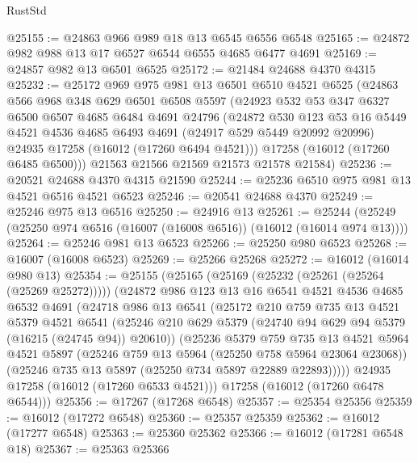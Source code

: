 \begin{lexlean}{RustStd}
\begin{coremodule}
@25155 := @24863 @966 @989 @18 @13 @6545 @6556 @6548
@25165 := @24872 @982 @988 @13 @17 @6527 @6544 @6555 @4685 @6477 @4691
@25169 := @24857 @982 @13 @6501 @6525
@25172 := @21484 @24688 @4370 @4315
@25232 := @25172
    @969
    @975
    @981
    @13
    @6501
    @6510
    @4521
    @6525
    (@24863
      @566
      @968
      @348
      @629
      @6501
      @6508
      @5597
      (@24923
        @532
        @53
        @347
        @6327
        @6500
        @6507
        @4685
        @6484
        @4691
        @24796
        (@24872
          @530
          @123
          @53
          @16
          @5449
          @4521
          @4536
          @4685
          @6493
          @4691
          (@24917 @529 @5449 @20992 @20996)
          @24935
          @17258
          (@16012 (@17260 @6494 @4521)))
        @17258
        (@16012 (@17260 @6485 @6500)))
      @21563
      @21566
      @21569
      @21573
      @21578
      @21584)
@25236 := @20521 @24688 @4370 @4315 @21590
@25244 := @25236 @6510 @975 @981 @13 @4521 @6516 @4521 @6523
@25246 := @20541 @24688 @4370
@25249 := @25246 @975 @13 @6516
@25250 := @24916 @13
@25261 := @25244 (@25249 (@25250 @974 @6516 (@16007 (@16008 @6516)) (@16012 (@16014 @974 @13))))
@25264 := @25246 @981 @13 @6523
@25266 := @25250 @980 @6523
@25268 := @16007 (@16008 @6523)
@25269 := @25266 @25268
@25272 := @16012 (@16014 @980 @13)
@25354 := @25155
    (@25165
      (@25169 (@25232 (@25261 (@25264 (@25269 @25272)))))
      (@24872
        @986
        @123
        @13
        @16
        @6541
        @4521
        @4536
        @4685
        @6532
        @4691
        (@24718
          @986
          @13
          @6541
          (@25172
            @210
            @759
            @735
            @13
            @4521
            @5379
            @4521
            @6541
            (@25246 @210 @629 @5379 (@24740 @94 @629 @94 @5379 (@16215 (@24745 @94)) @20610))
            (@25236
              @5379
              @759
              @735
              @13
              @4521
              @5964
              @4521
              @5897
              (@25246 @759 @13 @5964 (@25250 @758 @5964 @23064 @23068))
              (@25246 @735 @13 @5897 (@25250 @734 @5897 @22889 @22893)))))
        @24935
        @17258
        (@16012 (@17260 @6533 @4521)))
      @17258
      (@16012 (@17260 @6478 @6544)))
@25356 := @17267 (@17268 @6548)
@25357 := @25354 @25356
@25359 := @16012 (@17272 @6548)
@25360 := @25357 @25359
@25362 := @16012 (@17277 @6548)
@25363 := @25360 @25362
@25366 := @16012 (@17281 @6548 @18)
@25367 := @25363 @25366

\end{coremodule}
\end{lexlean}
